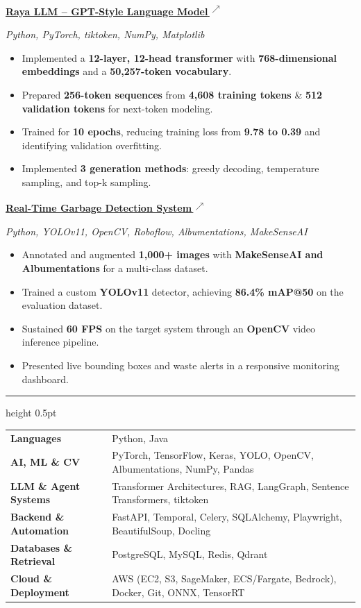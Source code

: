\documentclass[a4paper,10pt]{extarticle}
\newcommand{\ressection}[1]{%
    \par\vspace{3pt}
    \noindent{\fontsize{10.4}{11.4}\selectfont
    \bfseries\MakeUppercase{#1}}\par
    \vspace{1pt}
    \hrule height 0.5pt
    \vspace{2pt}
}
\newcommand{\project}[4]{%
    \par\vspace{1pt}\noindent
    \href{#4}{\textbf{#1}\,\textsuperscript{\(\nearrow\)}}%
    \hfill{\small #2}\par
    {\fontsize{9}{9.8}\selectfont\itshape #3\par}
}
\begin{document}
\project{Raya LLM -- GPT-Style Language Model}{}
{Python, PyTorch, tiktoken, NumPy, Matplotlib}
{https://github.com/RahulAgarwal701/Raya__LLM}
\begin{itemize}
    \item Implemented a \textbf{12-layer, 12-head transformer} with \textbf{768-dimensional embeddings} and a \textbf{50,257-token vocabulary}.
    \item Prepared \textbf{256-token sequences} from \textbf{4,608 training tokens} \& \textbf{512 validation tokens} for next-token modeling.
    \item Trained for \textbf{10 epochs}, reducing training loss from \textbf{9.78 to 0.39} and identifying validation overfitting.
    \item Implemented \textbf{3 generation methods}: greedy decoding, temperature sampling, and top-k sampling.
\end{itemize}

\project{Real-Time Garbage Detection System}{}
{Python, YOLOv11, OpenCV, Roboflow, Albumentations, MakeSenseAI}
{https://github.com/RahulAgarwal701/Garbage_Detection}

\begin{itemize}
    \item Annotated and augmented \textbf{1,000+ images} with
    \textbf{MakeSenseAI and Albumentations} for a multi-class dataset.

    \item Trained a custom \textbf{YOLOv11} detector, achieving
    \textbf{86.4\% mAP@50} on the evaluation dataset.

    \item Sustained \textbf{60 FPS} on the target system through
    an \textbf{OpenCV} video inference pipeline.

    \item Presented live bounding boxes and waste alerts in a responsive
    monitoring dashboard.
\end{itemize}

\ressection{Technical Skills}

\begin{tabularx}{\linewidth}{@{}p{138pt}X@{}}
    \textbf{Languages}
    & Python, Java\\[2pt]

    \textbf{AI, ML \& CV}
    & PyTorch, TensorFlow, Keras, YOLO, OpenCV,
      Albumentations, NumPy, Pandas\\[2pt]

    \textbf{LLM \& Agent Systems}
    & Transformer Architectures, RAG, LangGraph,
      Sentence Transformers, tiktoken\\[2pt]

    \textbf{Backend \& Automation}
    & FastAPI, Temporal, Celery, SQLAlchemy,
      Playwright, BeautifulSoup, Docling\\[2pt]

    \textbf{Databases \& Retrieval}
    & PostgreSQL, MySQL, Redis, Qdrant\\[2pt]

    \textbf{Cloud \& Deployment}
    & AWS (EC2, S3, SageMaker, ECS/Fargate, Bedrock),
      Docker, Git, ONNX, TensorRT
\end{tabularx}
\end{document}
